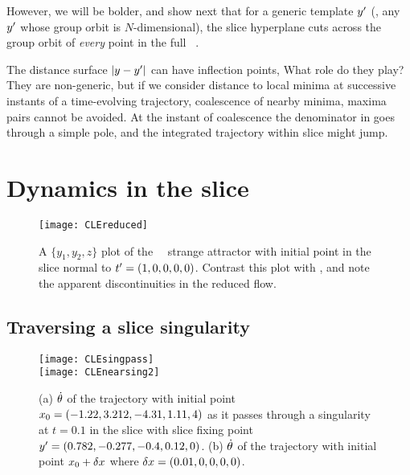 However, we will be bolder, and show next that for a generic template
${y'}$ (\ie, any ${y'}$ whose group orbit is $N$-dimensional), the
slice hyperplane  cuts across the group orbit of {\em
every} point in the full \statesp\ \pS.





The distance surface $|y - {y'}|$ can have inflection points,
What role do they play? They are non-generic, but if we consider distance
to local minima at successive instants of a time-evolving trajectory,
coalescence of
nearby minima, maxima pairs cannot be avoided. At the instant of
coalescence the denominator in  goes through a simple
pole, and the integrated trajectory within slice might jump.



\subsection{}
\subsubsection{}


\section{Dynamics in the slice}
\label{sect:MovFrameODE}


 \begin{figure}
 \texttt{[image: CLEreduced]}%
 \caption{\label{fig:CLErx2y1z}
A $\{y_1,y_2,z\}$ plot of the \reducedsp\ \cLf\ strange attractor
with initial point
in the
slice normal to $t'_{}=(1,0,0,0,0)$. Contrast this plot with
, and note the apparent discontinuities in the
reduced flow.
 }%
 \end{figure}

\subsection{Traversing a slice singularity}
\label{sect:passingSing}

 \begin{figure}
\texttt{[image: CLEsingpass]}
\\
\texttt{[image: CLEnearsing2]}%
 \caption{\label{fig:dthetasing}
 (a) $\dot{{\bf \theta}}$ of the trajectory with initial point
$x_0=(-1.22, 3.212, -4.31, 1.11, 4)$ as it passes through a
singularity at $t=0.1$ in the slice with slice fixing point
${y'}=(0.782,-0.277,-0.4,0.12,0)$.
(b) $\dot{{\bf \theta}}$ of the trajectory with initial point $x_0+\delta
x$ where $\delta x=(0.01,0,0,0,0)$.
 }%
 \end{figure}

%

